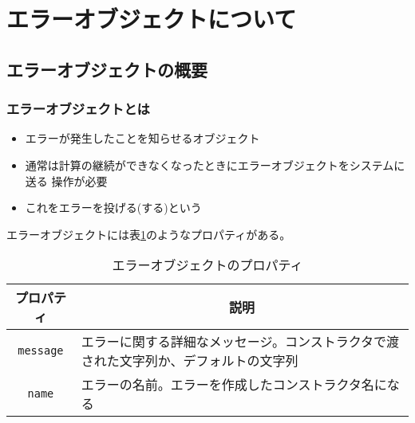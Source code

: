 \section{エラーオブジェクトについて}
\subsection{エラーオブジェクトの概要}
\begin{frame}[containsverbatim]
 \frametitle{エラーオブジェクトとは}
 \begin{itemize}
  \item エラーが発生したことを知らせるオブジェクト
  \item 通常は計算の継続ができなくなったときにエラーオブジェクトをシステムに送る
操作が必要
  \item これをエラーを投げる(する)という
 \end{itemize}

エラーオブジェクトには表\ref{ErrorProp}のようなプロパティがある。
\begin{table}
 \caption{エラーオブジェクトのプロパティ}\label{ErrorProp}
 \begin{center}
	 \begin{tabular}{|c|m{}|}\hline
		プロパティ&\multicolumn{1}{c|}{説明}\\ \hline
		\texttt{message}&エラーに関する詳細なメッセージ。コンストラクタで渡
				された文字列か、デフォルトの文字列\\ \hline
		\texttt{name}&エラーの名前。エラーを作成したコンストラクタ名になる\\ \hline

	\end{tabular}
 \end{center}
\end{table}
\end{frame}
